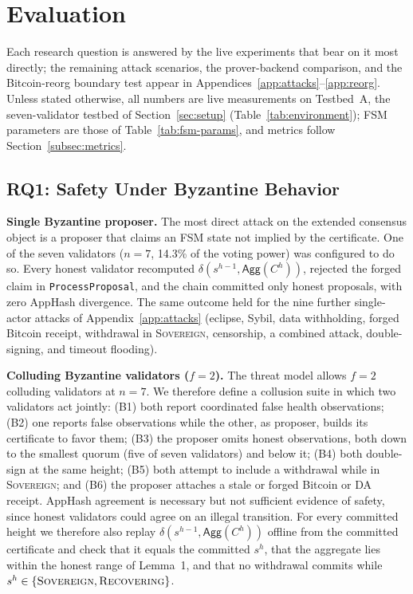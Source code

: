 \section{Evaluation}
\label{sec:evaluation}

Each research question is answered by the live experiments that bear on it
most directly; the remaining attack scenarios, the prover-backend
comparison, and the Bitcoin-reorg boundary test appear in
Appendices~\ref{app:attacks}--\ref{app:reorg}. Unless stated otherwise, all
numbers are live measurements on Testbed~A, the seven-validator testbed of
Section~\ref{sec:setup} (Table~\ref{tab:environment}); FSM parameters are
those of Table~\ref{tab:fsm-params}, and metrics follow
Section~\ref{subsec:metrics}.

\subsection{RQ1: Safety Under Byzantine Behavior}
\label{subsec:rq1}

\textbf{Single Byzantine proposer.} The most direct attack on the extended
consensus object is a proposer that claims an FSM state not implied by the
certificate. One of the seven validators ($n{=}7$, 14.3\% of the voting
power) was configured to do so. Every honest validator
recomputed $\delta(s^{h-1}, \mathsf{Agg}(C^{h}))$, rejected the forged claim
in \texttt{ProcessProposal}, and the chain committed only honest proposals,
with zero AppHash divergence. The same outcome held for the nine further
single-actor attacks of Appendix~\ref{app:attacks} (eclipse, Sybil, data
withholding, forged Bitcoin receipt, withdrawal in \textsc{Sovereign},
censorship, a combined attack, double-signing, and timeout flooding).

\textbf{Colluding Byzantine validators ($f{=}2$).} The threat model allows
$f{=}2$ colluding validators at $n{=}7$. We therefore define a collusion
suite in which two validators act jointly: (B1) both report coordinated
false health observations; (B2) one reports false observations while the
other, as proposer, builds its certificate to favor them; (B3) the proposer
omits honest observations, both down to the smallest quorum (five of
seven validators) and below it; (B4) both double-sign at the same height; (B5) both attempt to
include a withdrawal while in \textsc{Sovereign}; and (B6) the proposer
attaches a stale or forged Bitcoin or DA receipt. AppHash agreement is
necessary but not sufficient evidence of safety, since honest validators
could agree on an illegal transition. For every committed height we
therefore also replay $\delta(s^{h-1}, \mathsf{Agg}(C^{h}))$ offline from
the committed certificate and check that it equals the committed $s^{h}$,
that the aggregate lies within the honest range of Lemma~1, and that no
withdrawal commits while $s^{h} \in \{\textsc{Sovereign},
\textsc{Recovering}\}$.

